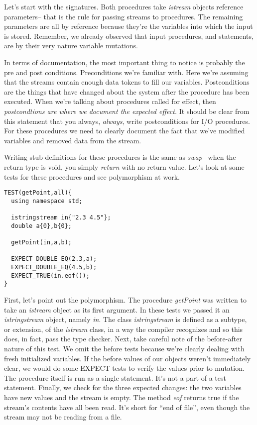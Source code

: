 \documentclass[nobib]{tufte-handout}
\begin{document}
Let's start with the signatures. Both procedures take \textit{istream} objects reference parameters-- that is the rule for passing streams to procedures.  The remaining parameters are all by reference because they're the variables into which the input is stored. Remember, we already observed that input procedures, and statements, are by their very nature variable mutations. 

In terms of documentation, the most important thing to notice is probably the pre and post conditions. Preconditions we're familiar with. Here we're assuming that the streams contain enough data tokens to fill our variables. Postconditions are the things that have changed about the system after the procedure has been executed. When we're talking about procedures called for effect, then \textit{postcondtions are where we document the expected effect.} It should be clear from this statement that you always, \textit{always}, write postconditions for I/O procedures. For these procedures we need to clearly document the fact that we've modified variables and removed data from the stream.  

Writing stub definitions for these procedures is the same as \textit{swap}-- when the return type is void, you simply \textit{return} with no return value.  Let's look at some tests for these procedures and see polymorphism at work.
\begin{verbatim}
TEST(getPoint,all){
  using namespace std;

  istringstream in{"2.3 4.5"};
  double a{0},b{0};

  getPoint(in,a,b);
  
  EXPECT_DOUBLE_EQ(2.3,a);
  EXPECT_DOUBLE_EQ(4.5,b);
  EXPECT_TRUE(in.eof());
}  
\end{verbatim}
First, let's point out the polymorphism. The procedure \textit{getPoint} was written to take an \textit{istream} object as its first argument. In these tests we passed it an \textit{istringstream} object, namely \textit{in}. The class \textit{istringstream} is defined as a subtype, or extension, of the \textit{istream} class, in a way the compiler recognizes and so this does, in fact, pass the type checker. Next, take careful note of the before-after nature of this test. We omit the before tests because we're clearly dealing with fresh initialized variables. If the before values of our objects weren't immediately clear, we would do some EXPECT tests to verify the values prior to mutation. The procedure itself is run as a single statement. It's not a part of a test statement. Finally, we check for the three expected changes: the two variables have new values and the stream is empty. The method \textit{eof} returns true if the stream's contents have all been read. It's short for ``end of file'', even though the stream may not be reading from a file. 
\end{document}
